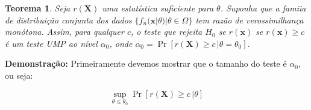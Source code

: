 \documentclass[a4paper,10pt, notitlepage]{report}
\newtheorem{teo}{Teorema}
\newcommand{\pr}{\operatorname{Pr}} %
\newcommand{\bX}{\boldsymbol{X}} %
\newcommand{\bx}{\boldsymbol{x}} %
\begin{document}
\begin{enumerate}
\begin{teo}
			Seja $r(\bX)$ uma estatística suficiente para $\theta$. Suponha que a famiia de distribuição conjunta dos dados $\{f_n(\bx|\theta)|\theta\in\Omega\}$ tem razão de verossimilhança monótona. Assim, para qualquer $c$, o teste que rejeita $H_0$ se $r(\bx)$ se $r(\bx)\geq c$ é um teste UMP ao nível $\alpha_0$, onde $\alpha_0=\pr[r(\bX)\geq c\,|\theta=\theta_0]$.
		\end{teo} 
	
	\textbf{Demonstração:} Primeiramente devemos mostrar que o tamanho do teste é $\alpha_0$, ou seja:
	
	$$\sup_{\theta\leq\theta_0}\pr[r(\bX)\geq c\,|\theta]$$
	
	\end{enumerate}
	
	
	
	
	
	
	
	
	
	
	
\end{document}
